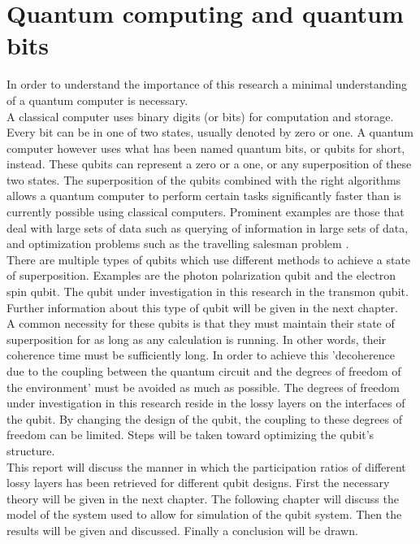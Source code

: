 \section{Quantum computing and quantum bits}
In order to understand the importance of this research a minimal understanding of a quantum computer is necessary. \\
A classical computer uses binary digits (or bits) for computation and storage. Every bit can be in one of two states, usually denoted by zero or one. A quantum computer however uses what has been named quantum bits, or qubits for short, instead. These qubits can represent a zero or a one, or any superposition of these two states. The superposition of the qubits combined with the right algorithms allows a quantum computer to perform certain tasks significantly faster than is currently possible using classical computers. Prominent examples are those that deal with large sets of data such as querying of information in large sets of data, and optimization problems such as the travelling salesman problem \cite{sep-qt-quantcomp}. \\
There are multiple types of qubits which use different methods to achieve a state of superposition. Examples are the photon polarization qubit and the electron spin qubit. The qubit under investigation in this research in the transmon qubit. Further information about this type of qubit will be given in the next chapter. \\
A common necessity for these qubits is that they must maintain their state of superposition for as long as any calculation is running. In other words, their coherence time must be sufficiently long. In order to achieve this 'decoherence due to the coupling between the quantum circuit and the degrees of freedom of the environment' \cite{Ithier2005} must be avoided as much as possible. The degrees of freedom under investigation in this research reside in the lossy layers on the interfaces of the qubit. By changing the design of the qubit, the coupling to these degrees of freedom can be limited. Steps will be taken toward optimizing the qubit's structure.\\
This report will discuss the manner in which the participation ratios of different lossy layers has been retrieved for different qubit designs. First the necessary theory will be given in the next chapter. The following chapter will discuss the model of the system used to allow for simulation of the qubit system. Then the results will be given and discussed. Finally a conclusion will be drawn. 
%	
%	
%	


